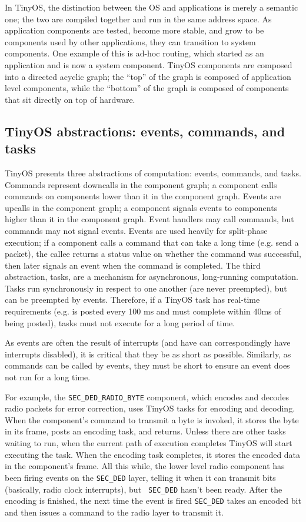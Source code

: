 \documentclass[12pt]{article}
\begin{document}
In TinyOS, the distinction between the OS and applications is merely a
semantic one; the two are compiled together and run in the same
address space. As application components are tested, become more
stable, and grow to be components used by other applications, they can
transition to system components. One example of this is ad-hoc
routing, which started as an application and is now a system
component. TinyOS components are composed into a directed acyclic
graph; the ``top'' of the graph is composed of application level
components, while the ``bottom'' of the graph is composed of
components that sit directly on top of hardware.

\subsection*{TinyOS abstractions: events, commands, and tasks}

TinyOS presents three abstractions of computation: events, commands,
and tasks. Commands represent downcalls in the component graph; a
component calls commands on components lower than it in the component
graph.  Events are upcalls in the component graph; a component signals
events to components higher than it in the component graph. Event
handlers may call commands, but commands may not signal events. Events
are used heavily for split-phase execution; if a component calls a
command that can take a long time (e.g. send a packet), the callee
returns a status value on whether the command was successful, then
later signals an event when the command is completed.  The third
abstraction, tasks, are a mechanism for asynchronous, long-running
computation. Tasks run synchronously in respect to one another (are
never preempted), but can be preempted by events. Therefore, if a
TinyOS task has real-time requirements (e.g. is posted every 100 ms
and must complete within 40ms of being posted), tasks must not execute
for a long period of time.

As events are often the result of interrupts (and have can
correspondingly have interrupts disabled), it is critical that they be
as short as possible. Similarly, as commands can be called by events,
they must be short to ensure an event does not run for a long time.

For example, the {\tt SEC\_DED\_RADIO\_BYTE} component, which encodes
and decodes radio packets for error correction, uses TinyOS tasks for
encoding and decoding. When the component's command to transmit a byte
is invoked, it stores the byte in its frame, posts an encoding task,
and returns. Unless there are other tasks waiting to run, when the
current path of execution completes TinyOS will start executing the
task. When the encoding task completes, it stores the encoded data in
the component's frame. All this while, the lower level radio component
has been firing events on the {\tt SEC\_DED} layer, telling it when it
can transmit bits (basically, radio clock interrupts), but {\tt
SEC\_DED} hasn't been ready. After the encoding is finished, the next
time the event is fired {\tt SEC\_DED} takes an encoded bit and then
issues a command to the radio layer to transmit it.
\end{document}
